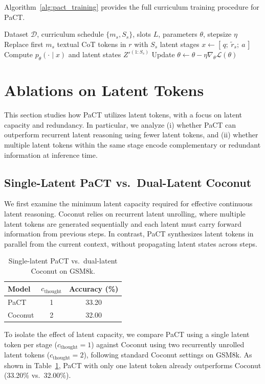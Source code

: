 Algorithm~\ref{alg:pact_training} provides the full curriculum training procedure for PaCT.

\begin{algorithm}[h]
\caption{Curriculum training for PaCT}
\label{alg:pact_training}
\begin{algorithmic}[1]
\Require Dataset $\mathcal{D}$, curriculum schedule $\{m_s,S_s\}$, slots $L$, parameters $\theta$, stepsize $\eta$
    \State Replace first $m_s$ textual CoT tokens in $r$ with $S_s$ latent stages
    \State $x \leftarrow [\,q;\ \tilde{r}_s;\ a\,]$
    \State Compute $p_\theta(\cdot\mid x)$ and latent states $Z'^{(1:S_s)}$
    \State Update $\theta \leftarrow \theta - \eta \nabla_\theta \mathcal{L}(\theta)$
  \EndFor
\EndFor
\end{algorithmic}
\end{algorithm}

\section{Ablations on Latent Tokens}
\label{app:additional_results}

This section studies how PaCT utilizes latent tokens, with a focus on latent capacity and redundancy. In particular, we analyze (i) whether PaCT can outperform recurrent latent reasoning using fewer latent tokens, and (ii) whether multiple latent tokens within the same stage encode complementary or redundant information at inference time.

\subsection{Single-Latent PaCT vs.\ Dual-Latent Coconut}
\label{sec:single_double}
We first examine the minimum latent capacity required for effective continuous latent reasoning. Coconut relies on recurrent latent unrolling, where multiple latent tokens are generated sequentially and each latent must carry forward information from previous steps. In contrast, PaCT synthesizes latent tokens in parallel from the current context, without propagating latent states across steps.
\begin{table}[h]
    \centering
    \small
    \caption{Single-latent PaCT vs.\ dual-latent Coconut on GSM8k.}
    \label{tab:1v2}
    \begin{tabular}{lcc}
        \toprule
        Model & $c_{\text{thought}}$ & Accuracy (\%) \\
        \midrule
        PaCT    & 1 & 33.20 \\
        Coconut & 2 & 32.00 \\
        \bottomrule
    \end{tabular}
\end{table}
To isolate the effect of latent capacity, we compare PaCT using a single latent token per stage ($c_{\text{thought}}=1$) against Coconut using two recurrently unrolled latent tokens ($c_{\text{thought}}=2$), following standard Coconut settings on GSM8k. As shown in Table~\ref{tab:1v2}, PaCT with only one latent token already outperforms Coconut (33.20\% vs.\ 32.00\%).

